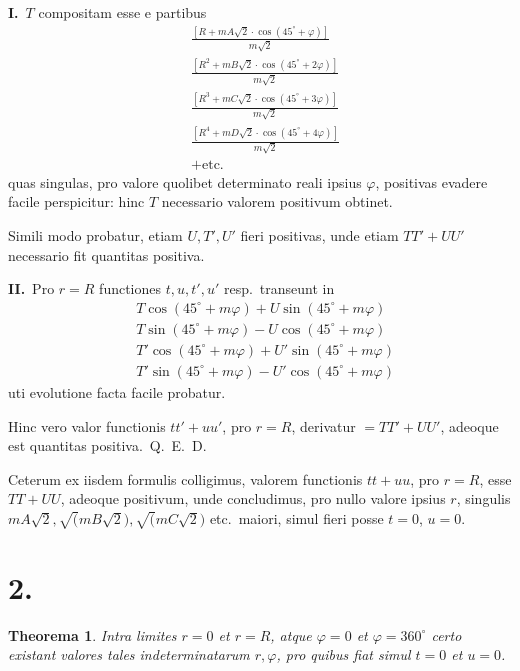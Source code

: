 \documentclass[12pt,a4paper]{article}
\theoremstyle{plain}
\newtheorem{theorema}{Theorema}[section]
\begin{document}
\textbf{I.}\ $T$ compositam esse e partibus
\begin{align*}
&\frac{[R + mA\surd 2 \cdot \cos(45^\circ + \varphi)]}{m\surd 2} \\
&\frac{[R^2 + mB\surd 2 \cdot \cos(45^\circ + 2\varphi)]}{m\surd 2} \\
&\frac{[R^3 + mC\surd 2 \cdot \cos(45^\circ + 3\varphi)]}{m\surd 2} \\
&\frac{[R^4 + mD\surd 2 \cdot \cos(45^\circ + 4\varphi)]}{m\surd 2} \\
&+ \text{etc.}
\end{align*}
quas singulas, pro valore quolibet determinato reali ipsius $\varphi$, positivas evadere
facile perspicitur: hinc $T$ necessario valorem positivum obtinet.

Simili modo probatur, etiam $U, T', U'$ fieri positivas, unde etiam $TT' + UU'$
necessario fit quantitas positiva.

\textbf{II.}\ Pro $r = R$ functiones $t, u, t', u'$ resp.\ transeunt in
\begin{align*}
&T\cos(45^\circ + m\varphi) + U\sin(45^\circ + m\varphi) \\
&T\sin(45^\circ + m\varphi) - U\cos(45^\circ + m\varphi) \\
&T'\cos(45^\circ + m\varphi) + U'\sin(45^\circ + m\varphi) \\
&T'\sin(45^\circ + m\varphi) - U'\cos(45^\circ + m\varphi)
\end{align*}
uti evolutione facta facile probatur.

Hinc vero valor functionis $tt' + uu'$, pro $r = R$, derivatur $= TT' + UU'$, adeoque est quantitas positiva.\ Q.\ E.\ D.

Ceterum ex iisdem formulis colligimus, valorem functionis $tt + uu$, pro $r = R$,
esse $TT + UU$, adeoque positivum, unde concludimus, pro nullo valore ipsius $r$,
singulis $mA\surd 2, \surd(mB\surd 2), \surd(mC\surd 2)$ etc.\ maiori, simul fieri posse $t = 0$, $u = 0$.

\section*{2.}

\begin{theorema}
Intra limites $r = 0$ et $r = R$, atque $\varphi = 0$ et $\varphi = 360^\circ$
certo existant valores tales indeterminatarum $r, \varphi$, pro quibus fiat simul $t = 0$ et $u = 0$.
\end{theorema}
\end{document}
